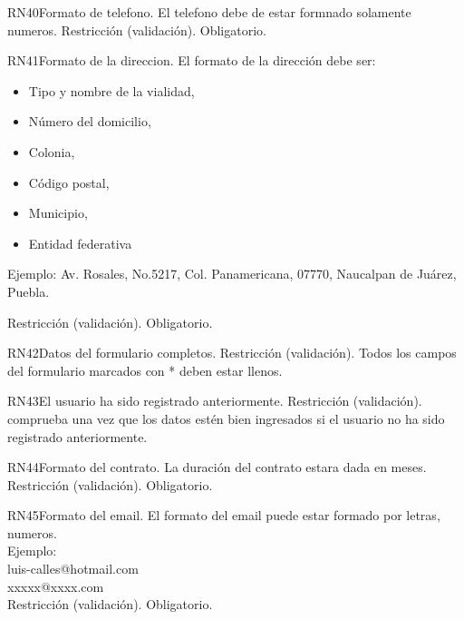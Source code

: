\begin{BussinesRule}{RN40}{Formato de telefono.} 
	\BRitem[Descripción:] El telefono debe de estar formnado solamente numeros.
	\BRitem[Tipo:] Restricción (validación).
	\BRitem[Nivel:] Obligatorio.
\end{BussinesRule}

\begin{BussinesRule}{RN41}{Formato de la direccion.} 
	\BRitem[Descripción:]El formato de la dirección debe ser:
		\begin{itemize}
			\item Tipo y nombre de la vialidad, 
			\item Número del domicilio, 
			\item Colonia, 
			\item Código postal, 
			\item Municipio, 
			\item Entidad federativa
		\end{itemize}
	Ejemplo: Av. Rosales, No.5217, Col. Panamericana, 07770, Naucalpan de Juárez, Puebla.	
	
	\BRitem[Tipo:] Restricción (validación).
	\BRitem[Nivel:] Obligatorio.
\end{BussinesRule}

\begin{BussinesRule}{RN42}{Datos del formulario completos.} 
	\BRitem[Tipo:] Restricción (validación).
	\BRitem[Descripción:]Todos los campos del formulario marcados con * deben estar llenos.
\end{BussinesRule}

\begin{BussinesRule}{RN43}{El usuario ha sido registrado anteriormente.} 
	\BRitem[Tipo:] Restricción (validación).
	\BRitem[Descripción:]comprueba una vez que los datos estén bien ingresados si el usuario no ha sido registrado anteriormente.
\end{BussinesRule}

\begin{BussinesRule}{RN44}{Formato del contrato.} 
	\BRitem[Descripción:] La duración del contrato estara dada en meses.
	\BRitem[Tipo:] Restricción (validación).
	\BRitem[Nivel:] Obligatorio.
\end{BussinesRule}

\begin{BussinesRule}{RN45}{Formato del email.} 
	\BRitem[Descripción:] El formato del email puede estar formado por letras, numeros.\\
	Ejemplo:\\
	luis-calles@hotmail.com\\
	xxxxx@xxxx.com\\

	\BRitem[Tipo:] Restricción (validación).
	\BRitem[Nivel:] Obligatorio.
\end{BussinesRule}

